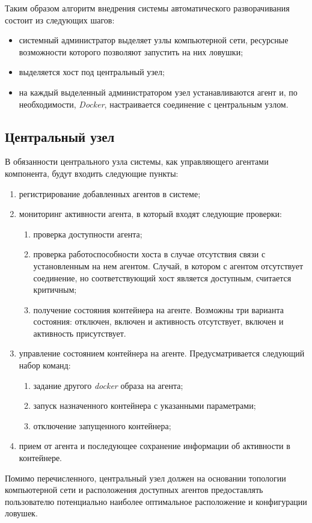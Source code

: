 Таким образом алгоритм внедрения системы автоматического разворачивания состоит из следующих шагов:

\begin{itemize}
	\item системный администратор выделяет узлы компьютерной сети, ресурсные возможности которого позволяют запустить на них ловушки;
	\item выделяется хост под центральный узел;
	\item на каждый выделенный администратором узел устанавливаются агент и, по необходимости, \textit{Docker}, настраивается соединение с центральным узлом.
\end{itemize}


\subsection{Центральный узел}

В обязанности центрального узла системы, как управляющего агентами компонента, будут входить следующие пункты:

\begin{enumerate}
	\item регистрирование добавленных агентов в системе;
	\item мониторинг активности агента, в который входят следующие проверки:
		\begin{enumerate}
			\item проверка доступности агента;
			\item проверка работоспособности хоста в случае отсутствия связи с установленным на нем агентом. Случай, в котором с агентом отсутствует соединение, но соответствующий хост является доступным, считается критичным;
			\item получение состояния контейнера на агенте. Возможны три варианта состояния: отключен, включен и активность отсутствует, включен и активность присутствует.	
		\end{enumerate}
	\item управление состоянием контейнера на агенте. Предусматривается следующий набор команд:
		\begin{enumerate}
			\item задание другого \textit{docker} образа на агента;
			\item запуск назначенного контейнера с указанными параметрами;
			\item отключение запущенного контейнера;
		\end{enumerate}
	\item прием от агента и последующее сохранение информации об активности в контейнере.
\end{enumerate}

Помимо перечисленного, центральный узел должен на основании топологии компьютерной сети и расположения доступных агентов предоставлять пользователю потенциально наиболее оптимальное расположение и конфигурации ловушек.